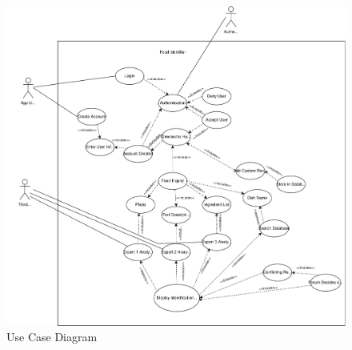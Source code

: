 \documentclass[]{article}
\begin{document}
\begin{figure}[H]
    \centering
    \includegraphics[width=\textwidth]{image/3_use_case_diagram.pdf}
    \caption{Use Case Diagram}
\end{figure}


%
%
%
\end{document}
